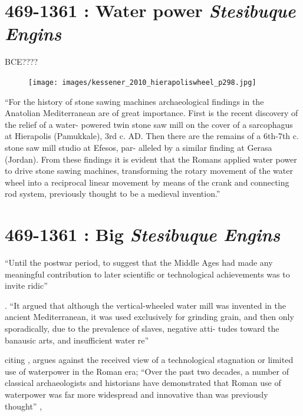 \documentclass[a4paper, 12pt]{article}
\begin{document}
\section{469-1361 \CE: Water power \textit{Stesibuque Engins}}
\label{sec:emerge:wheels}

\citet[Fig.~1-4,p.~3]{grewe_stone_2015}

BCE????

\begin{figure}
    \centering
    \texttt{[image: images/kessener\_2010\_hierapoliswheel\_p298.jpg]}
    \caption{ \citet[Fig.~2a,p.~298]{kessener_stone_2010} } 
    \label{fig:kessener_2010_hierapoliswheel_p298}
\end{figure}

``For the history of stone sawing machines archaeological findings in the Anatolian Mediterranean are of great importance. First is the recent discovery of the relief of a water- powered twin stone saw mill on the cover of a sarcophagus at Hierapolis (Pamukkale), 3rd c. AD. Then there are the remains of a 6th-7th c. stone saw mill studio at Efesos, par- alleled by a similar finding at Gerasa (Jordan). From these findings it is evident that the Romans applied water power to drive stone sawing machines, transforming the rotary movement of the water wheel into a reciprocal linear movement by means of the crank and connecting rod system, previously thought to be a medieval invention.'' \citet[p.~292]{kessener_stone_2010} 


\section{469-1361 \CE: Big \textit{Stesibuque Engins}}
\label{sec:emerge:principle}
``Until the postwar period, to suggest that the Middle Ages had made any meaningful contribution to later scientific or technological achievements was to invite ridic'' \citet[p.~2]{lucas_industrial_2005}

. ``It argued that although the vertical-wheeled water mill was invented in the ancient Mediterranean, it was used exclusively for grinding grain, and then only sporadically, due to the prevalence of slaves, negative atti- tudes toward the banausic arts, and insufficient water re''

\citet[p.~4]{lucas_industrial_2005}

citing \citet{wikander_handbook_2000}, \citeauthor{lucas_industrial_2005} argues against the received view  of a technological stagnation or limited use of waterpower in the Roman era; ``Over the past two decades, a number of classical archaeologists and historians have demonstrated that Roman use of waterpower was far more widespread and innovative than was previously thought'' \citet[p.~7]{lucas_industrial_2005},
\end{document}

